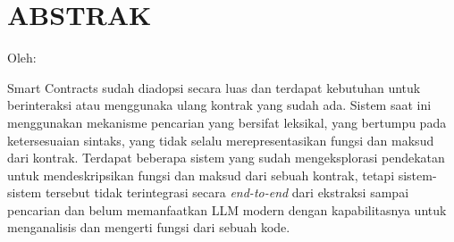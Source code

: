 \clearpage
\chapter*{ABSTRAK}
\begin{center}
	\center
	\begin{singlespace}
		\large\bfseries\MakeUppercase{\thetitle}

		\normalfont\normalsize
		Oleh:

		\bfseries \theauthor
	\end{singlespace}
\end{center}

\begin{singlespace}
	\small


	Smart Contracts sudah diadopsi secara luas dan terdapat kebutuhan untuk berinteraksi atau menggunaka ulang kontrak yang sudah ada. Sistem saat ini menggunakan mekanisme pencarian yang bersifat leksikal, yang bertumpu pada ketersesuaian sintaks, yang tidak selalu merepresentasikan fungsi dan maksud dari kontrak. Terdapat beberapa sistem yang sudah mengeksplorasi pendekatan untuk mendeskripsikan fungsi dan maksud dari sebuah kontrak, tetapi sistem-sistem tersebut tidak terintegrasi secara \textit{end-to-end} dari ekstraksi sampai pencarian dan belum memanfaatkan LLM modern dengan kapabilitasnya untuk menganalisis dan mengerti fungsi dari sebuah kode. 
	

\end{singlespace}
